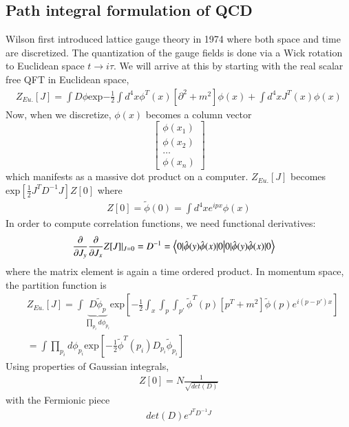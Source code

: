 \subsection{Path integral formulation of QCD}
Wilson \cite{Wilson:1974sk} first introduced lattice gauge theory in 1974 where both space and time are discretized. The quantization of the gauge fields is done via a Wick rotation to Euclidean space $t\rightarrow i\tau$. We will arrive at this by starting with the real scalar free QFT in Euclidean space,
\begin{align}
    Z_{Eu.}[J] = \int D\phi \text{exp}{-\frac{1}{2} \int d^4x \phi^T(x)[\partial^2 +m^2] \phi(x) + \int d^4xJ^T(x)\phi(x)} 
\end{align}  
Now, when we discretize, $\phi(x)$ becomes a column vector 
$$\begin{bmatrix}
    \phi(x_1) \\
    \phi(x_2) \\
    \dots \\
    \phi(x_n)
\end{bmatrix} $$
which manifests as a massive dot product on a computer. 
$Z_{Eu.}[J]$ becomes $\text{exp}[\frac{1}{2}J^T D^{-1}J] Z[0]$ where
\begin{align}
    Z[0] = \tilde{\phi}(0) = \int d^4x e^{ipx} \phi(x)
\end{align}
In order to compute correlation functions, we need functional derivatives: 
\begin{align}
    \frac{\partial}{\partial J_y} \frac{\partial}{\partial J_x} Z[J] \rvert_{J=0} = D^{-1} 
    &= \braket{0|{\hat{\phi}(y)\hat{\phi}(x)}|0}
\end{align}
where the matrix element is again a time ordered product. In momentum space, the partition function is 
\begin{eqnarray}
    & Z_{Eu.}[J] = \int \underbrace{D\tilde{\phi}_p}_{\prod_{p_i} d\phi_{p_i}} \text{exp}[-\frac{1}{2} \int_x \int_p \int_{p'} \tilde{\phi}^T(p)[p^T +m^2] \tilde{\phi}(p) e^{i(p-p')x}] \\ 
    &= \int \prod_{p_i} d\phi_{p_i} \text{exp}[-\frac{1}{2}\tilde{\phi}^T(p_i)D_{p_i}\tilde{\phi}_{p_i}]
\end{eqnarray}
Using properties of Gaussian integrals, 
\begin{align}
    Z[0] = N \frac{1}{\sqrt{det(D)}}
\end{align}
with the Fermionic piece 
\begin{align}
    det(D) e^{J^TD^{-1}J}
\end{align}

